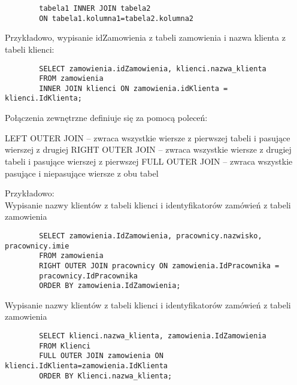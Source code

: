 \documentclass[main.tex]{subfiles}
\begin{document}
    \begin{verbatim}
        tabela1 INNER JOIN tabela2
        ON tabela1.kolumna1=tabela2.kolumna2
    \end{verbatim}
    Przykładowo, wypisanie idZamowienia z tabeli zamowienia i nazwa klienta z tabeli klienci:

    \begin{verbatim}
        SELECT zamowienia.idZamowienia, klienci.nazwa_klienta
        FROM zamowienia
        INNER JOIN klienci ON zamowienia.idKlienta = klienci.IdKlienta;
    \end{verbatim}

    Połączenia zewnętrzne definiuje się za pomocą poleceń:

    LEFT OUTER JOIN – zwraca wszystkie wiersze z pierwszej tabeli i pasujące wierszej z drugiej
    RIGHT OUTER JOIN – zwraca wszystkie wiersze z drugiej tabeli i pasujące wierszej z pierwszej
    FULL OUTER JOIN – zwraca wszystkie pasujące i niepasujące wiersze z obu tabel

    Przykładowo:\\
    Wypisanie nazwy klientów z tabeli klienci i identyfikatorów zamówień z tabeli zamowienia
    \begin{verbatim}
        SELECT zamowienia.IdZamowienia, pracownicy.nazwisko, pracownicy.imie
        FROM zamowienia
        RIGHT OUTER JOIN pracownicy ON zamowienia.IdPracownika =
        pracownicy.IdPracownika
        ORDER BY zamowienia.IdZamowienia;
    \end{verbatim}
    Wypisanie nazwy klientów z tabeli klienci i identyfikatorów zamówień z tabeli zamowienia

    \begin{verbatim}
        SELECT klienci.nazwa_klienta, zamowienia.IdZamowienia
        FROM Klienci
        FULL OUTER JOIN zamowienia ON klienci.IdKlienta=zamowienia.IdKlienta
        ORDER BY Klienci.nazwa_klienta;
    \end{verbatim}
\end{document}
